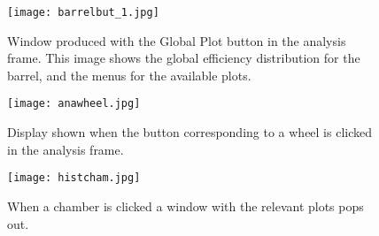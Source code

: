 \documentclass[11pt]{amsart}
\begin{document}
\begin{figure}[htb] %
   \centering
   \texttt{[image: barrelbut\_1.jpg]} 
   \caption{Window produced with the Global Plot button in the analysis frame. This image shows the global efficiency distribution for the barrel, and the menus for the available plots.}
   \label{fig:gpbarrel}
\end{figure}
\begin{figure}[htb] %
   \centering
   \texttt{[image: anawheel.jpg]} 
   \caption{Display shown when the button corresponding to a wheel is clicked in the analysis frame.}
   \label{fig:grapwheel}
\end{figure}
\begin{figure}[htb] %
   \centering
   \texttt{[image: histcham.jpg]} 
   \caption{When a chamber is clicked a window with the relevant plots pops out.}
   \label{fig:histcham}
\end{figure}
\end{document}
